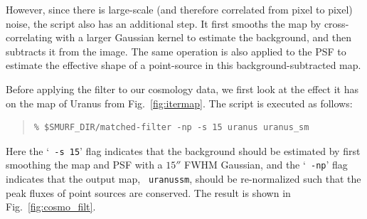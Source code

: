 \documentclass[twoside,11pt]{article}
\renewcommand{\_}{\texttt{\symbol{95}}}
\newenvironment{myquote}{\begin{quote}\begin{small}}{\end{small}\end{quote}}
\begin{document}
However, since there is large-scale (and therefore correlated from
pixel to pixel) noise, the script also has an additional step. It
first smooths the map by cross-correlating with a larger Gaussian
kernel to estimate the background, and then subtracts it from the
image. The same operation is also applied to the PSF to estimate the
effective shape of a point-source in this background-subtracted map.

Before applying the filter to our cosmology data, we first look at the
effect it has on the map of Uranus from Fig.~\ref{fig:itermap}. The script
is executed as follows:

\begin{myquote}
\begin{verbatim}
% $SMURF_DIR/matched-filter -np -s 15 uranus uranus_sm
\end{verbatim}
\end{myquote}
%
Here the `\texttt{ -s 15}' flag indicates that the background should
be estimated by first smoothing the map and PSF with a $15''$ FWHM
Gaussian, and the `\texttt{ -np}' flag indicates that the output map,
\texttt{ uranus\_sm}, should be re-normalized such that the peak
fluxes of point sources are conserved. The result is shown in
Fig.~\ref{fig:cosmo_filt}.
\end{document}
